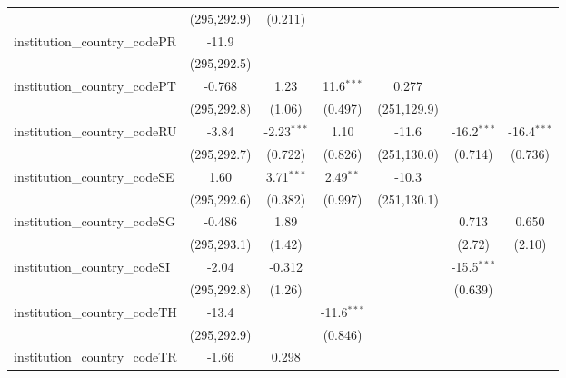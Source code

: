 \begin{tabular}{lcccccc}
                                         & (295,292.9)   & (0.211)       &               &               &               &   \\   
   institution\_country\_codePR          & -11.9         &               &               &               &               &   \\   
                                         & (295,292.5)   &               &               &               &               &   \\   
   institution\_country\_codePT          & -0.768        & 1.23          & 11.6$^{***}$  & 0.277         &               &   \\   
                                         & (295,292.8)   & (1.06)        & (0.497)       & (251,129.9)   &               &   \\   
   institution\_country\_codeRU          & -3.84         & -2.23$^{***}$ & 1.10          & -11.6         & -16.2$^{***}$ & -16.4$^{***}$\\   
                                         & (295,292.7)   & (0.722)       & (0.826)       & (251,130.0)   & (0.714)       & (0.736)\\   
   institution\_country\_codeSE          & 1.60          & 3.71$^{***}$  & 2.49$^{**}$   & -10.3         &               &   \\   
                                         & (295,292.6)   & (0.382)       & (0.997)       & (251,130.1)   &               &   \\   
   institution\_country\_codeSG          & -0.486        & 1.89          &               &               & 0.713         & 0.650\\   
                                         & (295,293.1)   & (1.42)        &               &               & (2.72)        & (2.10)\\   
   institution\_country\_codeSI          & -2.04         & -0.312        &               &               & -15.5$^{***}$ &   \\   
                                         & (295,292.8)   & (1.26)        &               &               & (0.639)       &   \\   
   institution\_country\_codeTH          & -13.4         &               & -11.6$^{***}$ &               &               &   \\   
                                         & (295,292.9)   &               & (0.846)       &               &               &   \\   
   institution\_country\_codeTR          & -1.66         & 0.298         &               &               &               &   \\   

\end{tabular}
